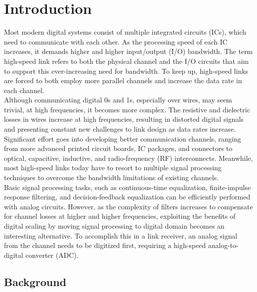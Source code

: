 \chapter{Introduction}
\graphicspath{{Introduction/Vector/}{Introduction/}}
Most modern digital systems consist of multiple integrated circuits 
(ICs), which need to communicate with each other. As the processing speed of each IC 
increases, it demands higher and higher input/output (I/O) bandwidth. The term high-speed link refers to both the physical channel and the I/O circuits that aim to support 
this ever-increasing need for bandwidth. To keep up, high-speed links are forced to 
both employ more parallel channels and increase the data rate in each channel.\\

Although communicating digital 0s and 1s, especially over wires, may 
seem trivial, at high frequencies, it becomes more complex. The resistive and 
dielectric losses in wires increase at high frequencies, resulting in distorted digital 
signals and presenting constant new challenges to link design as data rates increase. 
Significant effort goes into developing better communication channels, ranging from 
more advanced printed circuit boards, IC packages, and connectors to optical, 
capacitive, inductive, and radio-frequency (RF) interconnects. Meanwhile, most high-speed links today have to resort to multiple signal processing techniques to overcome 
the bandwidth limitations of existing channels.\\

Basic signal processing tasks, such as continuous-time equalization, 
finite-impulse response filtering, and decision-feedback equalization can be efficiently 
performed with analog circuits. However, as the complexity of filters increases to 
compensate for channel losses at higher and higher frequencies, exploiting the benefits 
of digital scaling by moving signal processing to digital domain becomes an 
interesting alternative. To accomplish this in a link receiver, an analog signal from the 
channel needs to be digitized first, requiring a high-speed analog-to-digital converter 
(ADC).

\section{Background}

